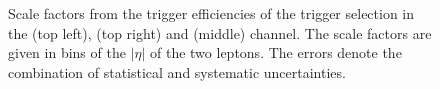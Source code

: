 \begin{figure}[htbp!]
\begin{center}
      \caption{Scale factors from the trigger efficiencies of the trigger selection in the \emu (top left), \mumu (top right) and \ee (middle) channel. The scale factors are given in bins of the $|\eta|$ of the two leptons. The errors denote the combination of statistical and systematic uncertainties.}  
    \label{fig:TrigSF}
  \end{center}
\end{figure}







